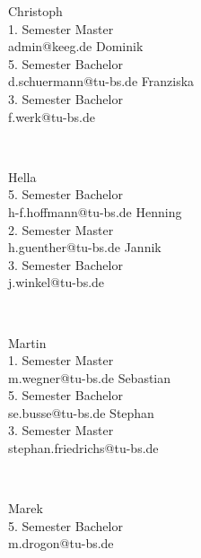 {Christoph\\ 1. Semester Master\\ admin@keeg.de}
\hfill
{}
{Dominik\\5. Semester Bachelor\\ d.schuermann@tu-bs.de}
\hfill
{}
{Franziska\\3. Semester Bachelor\\ f.werk@tu-bs.de}
\par \ \par
{}
{Hella\\ 5. Semester Bachelor\\ h-f.hoffmann@tu-bs.de}
\hfill
{}
{Henning\\ 2. Semester Master\\ h.guenther@tu-bs.de}
\hfill
{}
{Jannik\\ 3. Semester Bachelor\\ j.winkel@tu-bs.de}
\par \ \par
{}
{Martin\\ 1. Semester Master\\ m.wegner@tu-bs.de}
\hfill
{}
{Sebastian\\ 5. Semester Bachelor\\ se.busse@tu-bs.de}
\hfill
{}
{Stephan\\ 3. Semester Master\\ stephan.friedrichs@tu-bs.de}
\par \ \par
{}
{Marek\\ 5. Semester Bachelor\\ m.drogon@tu-bs.de}

\twocolumn
